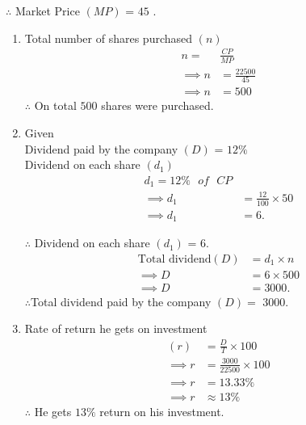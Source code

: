 \documentclass[journal,12pt,twocolumn]{IEEEtran}
\begin{document}
$\therefore$ Market Price \((MP)\) = \rupee $45$ . 
\begin{enumerate}
    \item 
    Total number of shares purchased $(n)$ 
    \begin{align}
       n =&\frac{CP}{MP} \\
       \implies n &= \frac{22500}{45}\\
       \implies n &= 500
    \end{align}
    $\therefore$ On total $500$ shares were purchased.
    \item
    Given\\
    Dividend paid by the company $(D)$ = $12\%$\\
    Dividend on each share $(d_1)$  
    \begin{align}
       d_1 = 12\% \text{ $of$ }CP\\
      \implies d_1 &= \frac{12}{100}\times 50\\  \implies d_1 &= 6 .
    \end{align}
    
    $\therefore$ Dividend on each share $(d_1)$ = \rupee$ 6$.
    \begin{align}
       \text{Total dividend$(D)$} &= d_1 \times n \\
       \implies D &= 6 \times 500 \\
       \implies D &= 3000 .
    \end{align}
    $\therefore$Total dividend paid by the company $(D) =$ \rupee $3000$.
    \item
    Rate of return he gets on investment
    \begin{align}
        (r) &= \frac{D}{T} \times 100\\
        \implies r &= \frac{3000}{22500}\times 100\\
        \implies r &= 13.33\%\\
        \implies r &\approx 13\%
    \end{align}
    $\therefore$ He gets $13\%$ return on his investment.
\end{enumerate}
\end{document}
